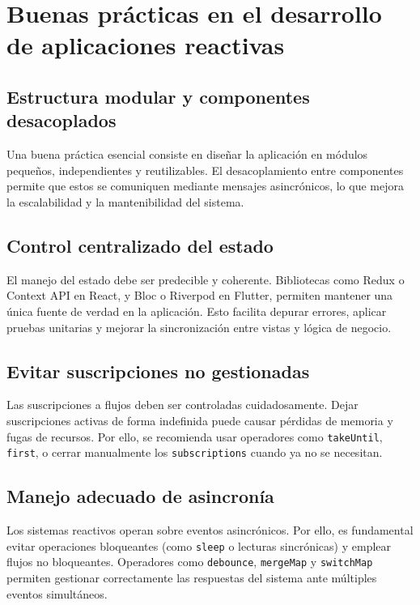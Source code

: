 \documentclass{article}
\begin{document}
\section{Buenas prácticas en el desarrollo de aplicaciones reactivas}

\subsection{Estructura modular y componentes desacoplados}

Una buena práctica esencial consiste en diseñar la aplicación en módulos pequeños, independientes y reutilizables. El desacoplamiento entre componentes permite que estos se comuniquen mediante mensajes asincrónicos, lo que mejora la escalabilidad y la mantenibilidad del sistema.

\subsection{Control centralizado del estado}

El manejo del estado debe ser predecible y coherente. Bibliotecas como Redux o Context API en React, y Bloc o Riverpod en Flutter, permiten mantener una única fuente de verdad en la aplicación. Esto facilita depurar errores, aplicar pruebas unitarias y mejorar la sincronización entre vistas y lógica de negocio.

\subsection{Evitar suscripciones no gestionadas}

Las suscripciones a flujos deben ser controladas cuidadosamente. Dejar suscripciones activas de forma indefinida puede causar pérdidas de memoria y fugas de recursos. Por ello, se recomienda usar operadores como \texttt{takeUntil}, \texttt{first}, o cerrar manualmente los \texttt{subscriptions} cuando ya no se necesitan.

\subsection{Manejo adecuado de asincronía}

Los sistemas reactivos operan sobre eventos asincrónicos. Por ello, es fundamental evitar operaciones bloqueantes (como \texttt{sleep} o lecturas sincrónicas) y emplear flujos no bloqueantes. Operadores como \texttt{debounce}, \texttt{mergeMap} y \texttt{switchMap} permiten gestionar correctamente las respuestas del sistema ante múltiples eventos simultáneos.
\end{document}
